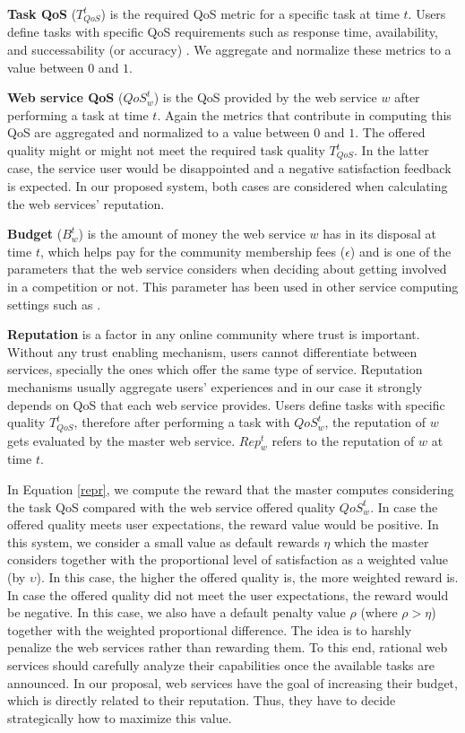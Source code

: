 \documentclass[fleqn]{singlecol-new}
\begin{document}
\textbf{Task QoS} ($T_{QoS}^t$) is the required QoS metric for a
specific task at time $t$. Users define tasks with specific QoS
requirements such as response time, availability, and
successability (or accuracy) \cite{Erbin}. We aggregate and
normalize these metrics to a value between $0$
and $1$. %

\textbf{Web service QoS} ($QoS_w^t$) is the QoS provided by the
web service $w$ after performing a task at time $t$. Again the
metrics that contribute in computing this QoS are aggregated and
normalized to a value between $0$ and $1$. The offered quality
might or might not meet the required task quality $T_{QoS}^t$. In
the latter case, the service user would be disappointed and a
negative satisfaction feedback is expected. In our proposed
system, both cases are considered when calculating the web
services' reputation.


\textbf{Budget} ($B_w^t$) is the amount of money the web service
$w$ has in its disposal at time $t$, which helps pay for the
community membership fees ($\epsilon$) and is one of the
parameters that the web service considers when deciding about
getting involved in a competition or not. This parameter has been
used in other service computing settings such as \cite{Erbin}.

\textbf{Reputation} is a factor in any online community where
trust is important. Without any trust enabling mechanism, users
cannot differentiate between services, specially the ones which
offer the same type of service. Reputation mechanisms usually
aggregate users' experiences and in our case it strongly depends
on QoS that each web service provides. Users define tasks with
specific quality $T_{QoS}^t$, therefore after performing a task
with $QoS_w^t$, the reputation of $w$ gets evaluated by the master
web service. $Rep_{w}^{t}$ refers to the reputation of $w$ at time
$t$.

In Equation \ref{repr}, we compute the reward that the master
computes considering the task QoS compared with the web service
offered quality $QoS_w^t$. In case the offered quality meets user
expectations, the reward value would be positive. In this system,
we consider a small value as default rewards $\eta$ which the
master considers together with the proportional level of
satisfaction as a weighted value (by $\upsilon$). In this case,
the higher the offered quality is, the more weighted reward is. In
case the offered quality did not meet the user expectations, the
reward would be negative. In this case, we also have a default
penalty value $\rho$ (where $\rho>\eta$) together with the
weighted proportional difference. The idea is to harshly penalize
the web services rather than rewarding them. To this end, rational
web services should carefully analyze their capabilities once the
available tasks are announced. In our proposal, web services have
the goal of increasing their budget, which is directly related to
their reputation. Thus, they have to decide strategically how to
maximize this value.
\end{document}
